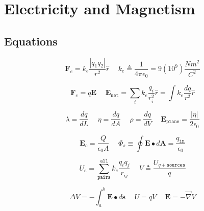 \documentclass[twocolumn, 12pt]{article}
\begin{document}
\small
\pagestyle{empty}

\section*{Electricity and Magnetism}
\subsection*{Equations}


\begin{equation*}
    \boxed{\textbf{F}_e = k_e \frac{|q_1q_2|}{r^2}\hat{r}}  \hspace{15pt}  k_e \triangleq \frac{1}{4\pi\epsilon_0} = 9(10^9) \frac{Nm^2}{C^2}
\end{equation*}

\begin{equation*}
    \textbf{F}_e = q\textbf{E}   \hspace{15pt}   \textbf{E}_{\texttt{net}} = \sum_i k_e\frac{q_i}{r_i^2}  \hat{r}  = \int k_e \frac{dq}{r^2} \hat{r}
\end{equation*}

\begin{equation*}
     \lambda = \frac{dq}{dL} \hspace{15pt} \eta = \frac{dq}{dA} \hspace{15pt} \rho =\frac{dq}{dV} \hspace{15pt} \textbf{E}_{\texttt{plane}} = \frac{|\eta|}{2\epsilon_0}
\end{equation*}

\begin{equation*}
    \textbf{E}_c = \frac{Q}{\epsilon_0 A}   \hspace{15pt}  \Phi_s \equiv \oint \textbf{E} \bullet d\textbf{A} = \frac{q_{\texttt{in}}}{\epsilon _0}
\end{equation*}

\begin{equation*}
    U_e = \sum^{\texttt{all}}_{\texttt{pairs}} k_e \frac{q_iq_j}{r_{ij}}   \hspace{15pt}  V \triangleq \frac{U_{q + \texttt{sources}}}{q}
\end{equation*}

\begin{equation*}
    \Delta V = -\int_a^b \textbf{E} \bullet d\textbf{s}   \hspace{15pt}   U=qV \hspace{15pt}  \textbf{E} = -\vec{\nabla} V
\end{equation*}
\end{document}
